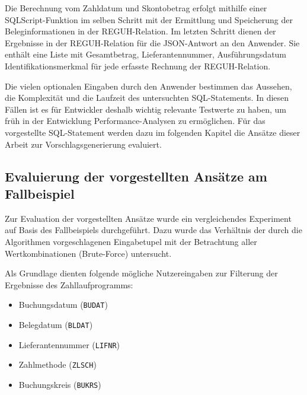 Die Berechnung vom Zahldatum und Skontobetrag erfolgt mithilfe einer SQLScript-Funktion im selben Schritt mit der Ermittlung und Speicherung der Beleginformationen in der REGUH-Relation.
Im letzten Schritt dienen der Ergebnisse in der REGUH-Relation für die JSON-Antwort an den Anwender.
Sie enthält eine Liste mit Gesamtbetrag, Lieferantennummer, Ausführungsdatum Identifikationsmerkmal für jede erfasste Rechnung der REGUH-Relation.

Die vielen optionalen Eingaben durch den Anwender bestimmen das Aussehen, die Komplexität und die Laufzeit des untersuchten SQL-Statements.
In diesen Fällen ist es für Entwickler deshalb wichtig relevante Testwerte zu haben, um früh in der Entwicklung Performance-Analysen zu ermöglichen.
Für das vorgestellte SQL-Statement werden dazu im folgenden Kapitel die Ansätze dieser Arbeit zur Vorschlagsgenerierung evaluiert.

\subsection{Evaluierung der vorgestellten Ansätze am Fallbeispiel}
Zur Evaluation der vorgestellten Ansätze wurde ein vergleichendes Experiment auf Basis des Fallbeispiels durchgeführt.
Dazu wurde das Verhältnis der durch die Algorithmen vorgeschlagenen Eingabetupel mit der Betrachtung aller Wertkombinationen (Brute-Force) untersucht.

Als Grundlage dienten folgende mögliche Nutzereingaben zur Filterung der Ergebnisse des Zahllaufprogramms:

   \begin{itemize}
      \item Buchungsdatum (\texttt{BUDAT})
      \item Belegdatum (\texttt{BLDAT})
			\item Lieferantennummer (\texttt{LIFNR})
			\item Zahlmethode (\texttt{ZLSCH})
			\item Buchungskreis (\texttt{BUKRS})
   \end{itemize}
	
